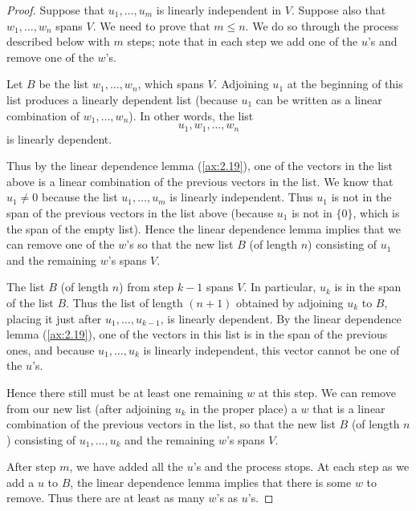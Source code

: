 \begin{proof}
Suppose that $u_1,\dots,u_m$ is linearly independent in $V$. Suppose also that
$w_1,\dots,w_n$ spans $V$. We need to prove that $m\le n$. We do so through the
process described below with $m$ steps; note that in each step we add one of
the $u$'s and remove one of the $w$'s.
\begin{description}[style=nextline,leftmargin=1em,itemsep=2pt,parsep=3pt]
\item[Step 1] Let $B$ be the list $w_1,\dots,w_n$, which spans $V$. Adjoining
  $u_1$ at the beginning of this list produces a linearly dependent list
  (because $u_1$ can be written as a linear combination of $w_1,\dots,w_n$). In
  other words, the list
  \[ u_1,w_1,\dots,w_n \]
  is linearly dependent.

  Thus by the linear dependence lemma (\ref{ax:2.19}), one of the vectors in
  the list above is a linear combination of the previous vectors in the list.
  We know that $u_1\ne0$ because the list $u_1,\dots,u_m$ is linearly
  independent. Thus $u_1$ is not in the span of the previous vectors in the
  list above (because $u_1$ is not in $\{0\}$, which is the span of the empty
  list). Hence the linear dependence lemma implies that we can remove one of
  the $w$'s so that the new list $B$ (of length $n$) consisting of $u_1$ and
  the remaining $w$'s spans $V$.
\item[Step $\bm{k}$, for $\bm{k=2},\dots,\bm{m}$] The list $B$ (of length $n$) from
  step $k-1$ spans $V$. In particular, $u_k$ is in the span of the list $B$.
  Thus the list of length $(n+1)$ obtained by adjoining $u_k$ to $B$, placing
  it just after $u_1,\dots,u_{k-1}$, is linearly dependent. By the linear
  dependence lemma (\ref{ax:2.19}), one of the vectors in this list is in the
  span of the previous ones, and because $u_1,\dots,u_k$ is linearly
  independent, this vector cannot be one of the $u$'s.

  Hence there still must be at least one remaining $w$ at this step. We can
  remove from our new list (after adjoining $u_k$ in the proper place) a $w$
  that is a linear combination of the previous vectors in the list, so that the
  new list $B$ (of length $n$) consisting of $u_1,\dots,u_k$ and the remaining
  $w$'s spans $V$.
\end{description}

After step $m$, we have added all the $u$'s and the process stops. At each step
as we add a $u$ to $B$, the linear dependence lemma implies that there is some
$w$ to remove. Thus there are at least as many $w$'s as $u$'s.
\end{proof}

